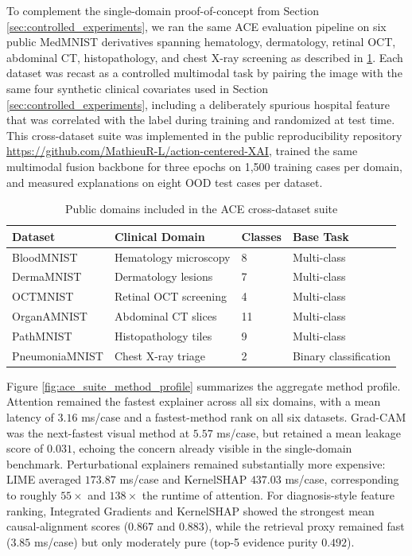 \documentclass[pdflatex,sn-mathphys-num]{sn-jnl}%
\theoremstyle{thmstyleone}%
\theoremstyle{thmstyletwo}%
\theoremstyle{thmstylethree}%
\begin{document}
\begin{itemize}
To complement the single-domain proof-of-concept from Section \ref{sec:controlled_experiments}, we ran the same ACE evaluation pipeline on six public MedMNIST derivatives spanning hematology, dermatology, retinal OCT, abdominal CT, histopathology, and chest X-ray screening as described in \ref{tab:ace_suite_domains}. Each dataset was recast as a controlled multimodal task by pairing the image with the same four synthetic clinical covariates used in Section \ref{sec:controlled_experiments}, including a deliberately spurious hospital feature that was correlated with the label during training and randomized at test time. This cross-dataset suite was implemented in the public reproducibility repository \url{https://github.com/MathieuR-L/action-centered-XAI}, trained the same multimodal fusion backbone for three epochs on 1,500 training cases per domain, and measured explanations on eight OOD test cases per dataset.

\begin{table}[h!]
\centering
\caption{Public domains included in the ACE cross-dataset suite}
\label{tab:ace_suite_domains}
\begin{tabular}{|l|l|l|l|}
\hline
\textbf{Dataset} & \textbf{Clinical Domain} & \textbf{Classes} & \textbf{Base Task} \\ \hline
BloodMNIST & Hematology microscopy & 8 & Multi-class \\ \hline
DermaMNIST & Dermatology lesions & 7 & Multi-class \\ \hline
OCTMNIST & Retinal OCT screening & 4 & Multi-class \\ \hline
OrganAMNIST & Abdominal CT slices & 11 & Multi-class \\ \hline
PathMNIST & Histopathology tiles & 9 & Multi-class \\ \hline
PneumoniaMNIST & Chest X-ray triage & 2 & Binary classification \\ \hline
\end{tabular}
\end{table}

Figure \ref{fig:ace_suite_method_profile} summarizes the aggregate method profile. Attention remained the fastest explainer across all six domains, with a mean latency of $3.16$ ms/case and a fastest-method rank on all six datasets. Grad-CAM was the next-fastest visual method at $5.57$ ms/case, but retained a mean leakage score of $0.031$, echoing the concern already visible in the single-domain benchmark. Perturbational explainers remained substantially more expensive: LIME averaged $173.87$ ms/case and KernelSHAP $437.03$ ms/case, corresponding to roughly $55\times$ and $138\times$ the runtime of attention. For diagnosis-style feature ranking, Integrated Gradients and KernelSHAP showed the strongest mean causal-alignment scores ($0.867$ and $0.883$), while the retrieval proxy remained fast ($3.85$ ms/case) but only moderately pure (top-5 evidence purity $0.492$).


\end{itemize}
\end{document}
